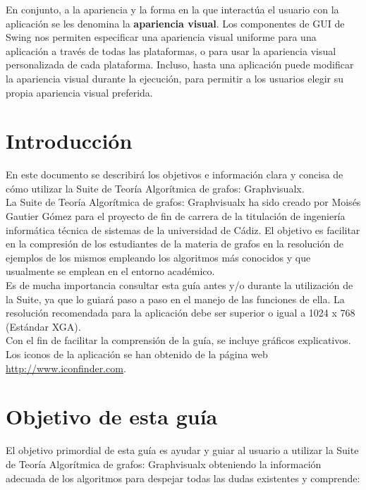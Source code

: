 En conjunto, a la apariencia y la forma en la que interactúa el usuario con la aplicación se les denomina la \textbf{apariencia visual}. Los componentes de GUI de Swing nos permiten especificar una apariencia visual uniforme para una aplicación a través de todas las plataformas, o para usar la apariencia visual personalizada de cada plataforma. Incluso, hasta una aplicación puede modificar la apariencia visual durante la ejecución, para permitir a los usuarios elegir su propia apariencia visual preferida.\\

\section{Introducción}

En este documento se describirá los objetivos e información clara y concisa de cómo utilizar la Suite de Teoría Algorítmica de grafos: Graphvisualx.\\

La Suite de Teoría Algorítmica de grafos: Graphvisualx ha sido creado por Moisés Gautier Gómez para el proyecto de fin de carrera de la titulación de ingeniería informática técnica de sistemas de la universidad de Cádiz. El objetivo es facilitar en la compresión de los estudiantes de la materia de grafos en la resolución de ejemplos de los mismos empleando los algoritmos más conocidos y que usualmente se emplean en el entorno académico.\\

Es de mucha importancia consultar esta guía antes y/o durante la utilización de la Suite, ya que lo guiará paso a paso en el manejo de las funciones de ella. La resolución recomendada para la aplicación debe ser superior o igual a 1024 x 768 (Estándar XGA). \\

Con el fin de facilitar la comprensión de la guía, se incluye gráficos explicativos. Los iconos de la aplicación se han obtenido de la página web \url{http://www.iconfinder.com}. \\

\section{Objetivo de esta guía}

El objetivo primordial de esta guía es ayudar y guiar al usuario a utilizar la Suite de Teoría Algorítmica de grafos: Graphvisualx obteniendo la información adecuada de los algoritmos para despejar todas las dudas existentes y comprende:

